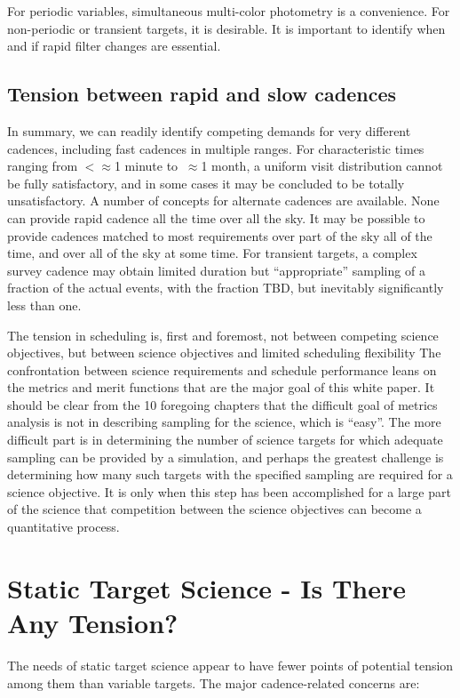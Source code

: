 For periodic variables, simultaneous multi-color photometry is a convenience.  For non-periodic or transient targets, it is desirable. It is important to identify when and if rapid filter changes are essential.

\subsection{Tension between rapid and slow cadences}

In summary, we can readily identify competing demands for very different cadences, including fast cadences in multiple ranges. For characteristic times ranging from  $<\approx$1 minute to $~\approx$1 month, a uniform visit distribution cannot be fully satisfactory, and in some cases it may be concluded to be totally unsatisfactory.  A number of concepts for alternate cadences are available.  None can provide rapid cadence all the time over all the sky. It may be possible to provide cadences matched to most requirements over part of the sky all of the time, and over all of the sky at some time. For transient targets, a complex survey cadence may obtain limited duration but ``appropriate'' sampling of a fraction of the actual events, with the fraction TBD, but inevitably significantly less than one. 

The tension in scheduling is, first and foremost, not between competing science objectives, but between science objectives and limited scheduling flexibility The confrontation between science requirements and schedule performance leans on the metrics and merit functions that are the major goal of this white paper.  It should be clear from the 10 foregoing chapters that the difficult goal of metrics analysis is not in describing sampling for the science, which is ``easy''.  The more difficult part is in determining the number of science targets for which adequate sampling can be provided by a simulation, and perhaps the greatest challenge is determining how many such targets with the specified sampling are required for a science objective.  It is only when this step has been accomplished for a large part of the science that competition between the science objectives can become a quantitative process.


\section{Static Target Science - Is There Any Tension?}

The needs of static target science appear to have fewer points of potential tension among them than variable targets.  The major cadence-related concerns are:

